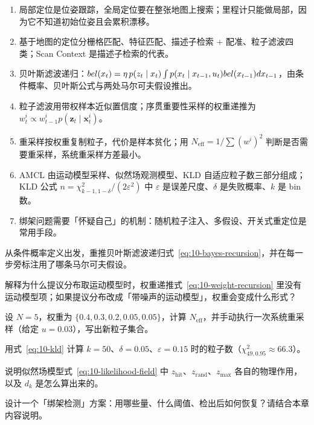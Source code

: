 \begin{summary}

\begin{enumerate}
  \item 局部定位是位姿跟踪，全局定位要在整张地图上搜索；里程计只能做局部，因为它不知道初始位姿且会累积漂移。
  \item 基于地图的定位分栅格匹配、特征匹配、描述子检索 + 配准、粒子滤波四类；Scan Context 是描述子检索的代表。
  \item 贝叶斯滤波递归：$bel(x_t)=\eta\,p(z_t\mid x_t)\int p(x_t\mid x_{t-1},u_t)bel(x_{t-1})dx_{t-1}$，由条件概率、贝叶斯公式与两处马尔可夫假设推出。
  \item 粒子滤波用带权样本近似置信度；序贯重要性采样的权重递推为 $w_t^{i}\propto w_{t-1}^{i}p(\bm{z}_t\mid\bm{x}_t^{i})$。
  \item 重采样按权重复制粒子，代价是样本贫化；用 $N_{\text{eff}}=1/\sum(w^{i})^{2}$ 判断是否需要重采样，系统重采样方差最小。
  \item AMCL 由运动模型采样、似然场观测模型、KLD 自适应粒子数三部分组成；KLD 公式 $n=\chi^{2}_{k-1,1-\delta}/(2\varepsilon^{2})$ 中 $\varepsilon$ 是误差尺度、$\delta$ 是失败概率、$k$ 是 bin 数。
  \item 绑架问题需要「怀疑自己」的机制：随机粒子注入、多假设、开关式重定位是常用手段。
\end{enumerate}


\end{summary}

\begin{problemset}

  \item 从条件概率定义出发，重推贝叶斯滤波递归式~\eqref{eq:10-bayes-recursion}，并在每一步旁标注用了哪条马尔可夫假设。
  \item 解释为什么提议分布取运动模型时，权重递推式~\eqref{eq:10-weight-recursion} 里没有运动模型项；如果提议分布改成「带噪声的运动模型」，权重会变成什么形式？
  \item 设 $N=5$，权重为 $\{0.4,0.3,0.2,0.05,0.05\}$，计算 $N_{\text{eff}}$，并手动执行一次系统重采样（给定 $u=0.03$），写出新粒子集合。
  \item 用式~\eqref{eq:10-kld} 计算 $k=50$、$\delta=0.05$、$\varepsilon=0.15$ 时的粒子数（$\chi^{2}_{49,0.95}\approx66.3$）。
  \item 说明似然场模型式~\eqref{eq:10-likelihood-field} 中 $z_{\text{hit}}$、$z_{\text{rand}}$、$z_{\max}$ 各自的物理作用，以及 $d_k$ 是怎么算出来的。
  \item 设计一个「绑架检测」方案：用哪些量、什么阈值、检出后如何恢复？请结合本章内容说明。
\end{problemset}

